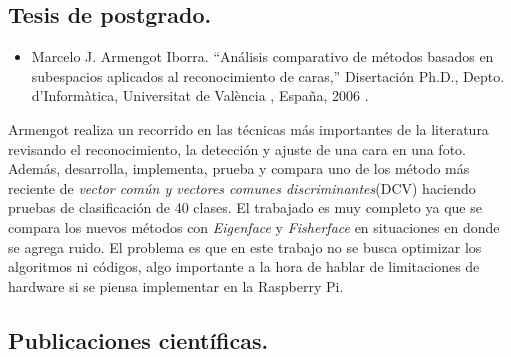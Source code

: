 \documentclass[letterpaper,12pt]{article}
\begin{document}
\begin{itemize}
\subsection{Tesis de postgrado.}
% 
%

\begin{itemize}
\item Marcelo J. Armengot Iborra. ``Análisis comparativo de métodos basados en subespacios aplicados al reconocimiento de caras,'' Disertación Ph.D., Depto. d'Informàtica, Universitat de València , España, 2006 \cite{VniversitatDValencia}.
\end{itemize}

Armengot realiza un recorrido en las técnicas  más importantes de la literatura revisando el reconocimiento, la detección y ajuste de una cara en una foto.
Además, desarrolla, implementa, prueba y compara uno de los método más reciente de \emph{ vector común y vectores comunes discriminantes}(DCV) haciendo pruebas de clasificación de 40 clases. El trabajado es muy completo ya que se compara los nuevos métodos con \emph{Eigenface} y \emph{Fisherface} en situaciones en donde se agrega ruido. El problema es que en este trabajo no se busca optimizar los algoritmos ni códigos, algo importante a la hora de hablar de limitaciones de hardware si se piensa implementar en la Raspberry Pi.
\end{itemize}


\subsection{Publicaciones científicas.}
%
\end{document}
